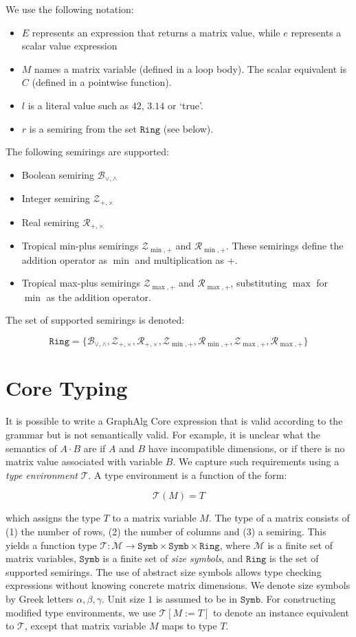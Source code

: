 \documentclass{article}
\newcommand\graphalg{\textsf{GraphAlg}}
\newcommand{\tenv}{\mathcal{T}}
\newcommand{\Ring}{\texttt{Ring}}
\newcommand{\ringBool}{\mathcal{B}_{\lor,\land}}
\newcommand{\ringInt}{\mathcal{Z}_{+,\times}}
\newcommand{\ringReal}{\mathcal{R}_{+,\times}}
\newcommand{\ringTropInt}{\mathcal{Z}_{\min,+}}
\newcommand{\ringTropReal}{\mathcal{R}_{\min,+}}
\newcommand{\ringTropMaxInt}{\mathcal{Z}_{\max,+}}
\newcommand{\ringTropMaxReal}{\mathcal{R}_{\max,+}}
\newcommand{\Mnam}{\mathcal{M}}
\newcommand{\DD}{\texttt{Symb}}
\begin{document}
We use the following notation:
\begin{itemize}
    \item $E$ represents an expression that returns a matrix value, while $e$ represents a scalar value expression
    \item $M$ names a matrix variable (defined in a loop body).
          The scalar equivalent is $C$ (defined in a pointwise function).
    \item $l$ is a literal value such as $42$, $3.14$ or `true'.
    \item $r$ is a semiring from the set $\Ring$ (see below).
\end{itemize}

The following semirings are supported:

\begin{itemize}
    \item Boolean semiring $\ringBool$
    \item Integer semiring $\ringInt$
    \item Real semiring $\ringReal$
    \item Tropical min-plus semirings $\ringTropInt$ and $\ringTropReal$.
          These semirings define the addition operator as $\min$ and multiplication as $+$.
    \item Tropical max-plus semirings $\ringTropMaxInt$ and $\ringTropMaxReal$, substituting $\max$ for $\min$ as the addition operator.
\end{itemize}

The set of supported semirings is denoted:

\[
    \Ring = \{ \ringBool, \ringInt, \ringReal, \ringTropInt, \ringTropReal, \ringTropMaxInt, \ringTropMaxReal \}
\]

\section{Core Typing}
It is possible to write a \graphalg{} Core expression that is valid according to the grammar but is not semantically valid.
For example, it is unclear what the semantics of $A \cdot B$ are if $A$ and $B$ have incompatible dimensions, or if there is no matrix value associated with variable $B$.
We capture such requirements using a \emph{type environment} $\tenv$.
A type environment is a function of the form:

\[
    \tenv(M) = T
\]

which assigns the type $T$ to a matrix variable $M$.
The type of a matrix consists of (1) the number of rows, (2) the number of columns and (3) a semiring.
This yields a function type $\tenv : \Mnam \to \DD \times \DD \times \Ring$, where
$\Mnam$ is a finite set of matrix variables, $\DD$ is a finite set of \emph{size symbols}, and $\Ring$ is the set of supported semirings.
The use of abstract size symbols allows type checking expressions without knowing concrete matrix dimensions.
We denote size symbols by Greek letters $\alpha,\beta,\gamma$.
Unit size $1$ is assumed to be in $\DD$.
For constructing modified type environments, we use $\tenv[M := T]$ to denote an instance equivalent to $\tenv$, except that matrix variable $M$ maps to type $T$.
\end{document}
